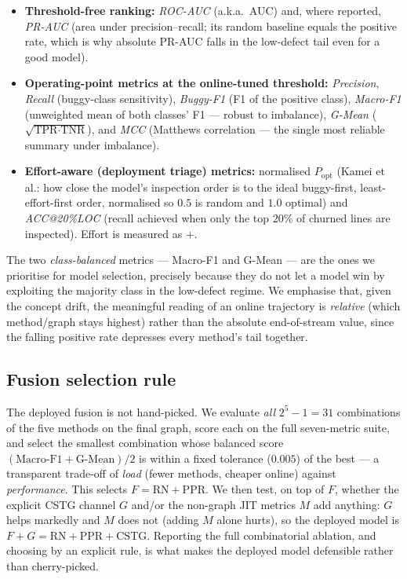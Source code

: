 	\begin{itemize}
		\item \textbf{Threshold-free ranking:} \emph{ROC-AUC} (a.k.a.\ AUC) and, where
		reported, \emph{PR-AUC} (area under precision--recall; its random baseline equals the
		positive rate, which is why absolute PR-AUC falls in the low-defect tail even for a
		good model).
		\item \textbf{Operating-point metrics at the online-tuned threshold:} \emph{Precision},
		\emph{Recall} (buggy-class sensitivity), \emph{Buggy-F1} (F1 of the positive class),
		\emph{Macro-F1} (unweighted mean of both classes' F1 --- robust to imbalance),
		\emph{G-Mean} ($\sqrt{\text{TPR}\cdot\text{TNR}}$), and \emph{MCC} (Matthews
		correlation --- the single most reliable summary under imbalance).
		\item \textbf{Effort-aware (deployment triage) metrics:} normalised
		$P_{\mathrm{opt}}$ (Kamei et al.: how close the model's inspection order is to the
		ideal buggy-first, least-effort-first order, normalised so $0.5$ is random and $1.0$
		optimal) and \emph{ACC@20\%LOC} (recall achieved when only the top $20\%$ of churned
		lines are inspected). Effort is measured as $+$.
	\end{itemize}
	The two \emph{class-balanced} metrics --- Macro-F1 and G-Mean --- are the ones we
	prioritise for model selection, precisely because they do not let a model win by
	exploiting the majority class in the low-defect regime. We emphasise that, given the
	concept drift, the meaningful reading of an online trajectory is \emph{relative} (which
	method/graph stays highest) rather than the absolute end-of-stream value, since the
	falling positive rate depresses every method's tail together.
	
	\subsection{Fusion selection rule}
	\label{sec:setup-fusion-selection}
	
	The deployed fusion is not hand-picked. We evaluate \emph{all} $2^5-1=31$ combinations
	of the five methods on the final graph, score each on the full seven-metric suite, and
	select the smallest combination whose balanced score
	$(\text{Macro-F1}+\text{G-Mean})/2$ is within a fixed tolerance ($0.005$) of the best ---
	a transparent trade-off of \emph{load} (fewer methods, cheaper online) against
	\emph{performance}. This selects $F=\text{RN}{+}\text{PPR}$. We then test, on top of
	$F$, whether the explicit CSTG channel $G$ and/or the non-graph JIT metrics $M$ add
	anything: $G$ helps markedly and $M$ does not (adding $M$ alone hurts), so the deployed
	model is $F{+}G=\text{RN}{+}\text{PPR}{+}\text{CSTG}$. Reporting the full combinatorial
	ablation, and choosing by an explicit rule, is what makes the deployed model
	defensible rather than cherry-picked.
	
